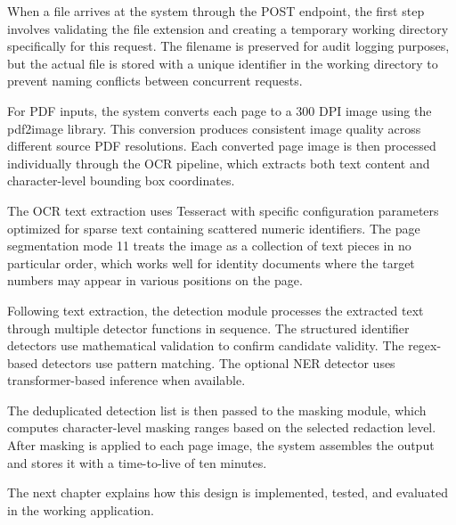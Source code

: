When a file arrives at the system through the POST endpoint, the first step involves validating the file extension and creating a temporary working directory specifically for this request. The filename is preserved for audit logging purposes, but the actual file is stored with a unique identifier in the working directory to prevent naming conflicts between concurrent requests.

For PDF inputs, the system converts each page to a 300 DPI image using the pdf2image library. This conversion produces consistent image quality across different source PDF resolutions. Each converted page image is then processed individually through the OCR pipeline, which extracts both text content and character-level bounding box coordinates.

The OCR text extraction uses Tesseract with specific configuration parameters optimized for sparse text containing scattered numeric identifiers. The page segmentation mode 11 treats the image as a collection of text pieces in no particular order, which works well for identity documents where the target numbers may appear in various positions on the page.

Following text extraction, the detection module processes the extracted text through multiple detector functions in sequence. The structured identifier detectors use mathematical validation to confirm candidate validity. The regex-based detectors use pattern matching. The optional NER detector uses transformer-based inference when available.

The deduplicated detection list is then passed to the masking module, which computes character-level masking ranges based on the selected redaction level. After masking is applied to each page image, the system assembles the output and stores it with a time-to-live of ten minutes.

\bigskip

The next chapter explains how this design is implemented, tested, and evaluated in the working application.
